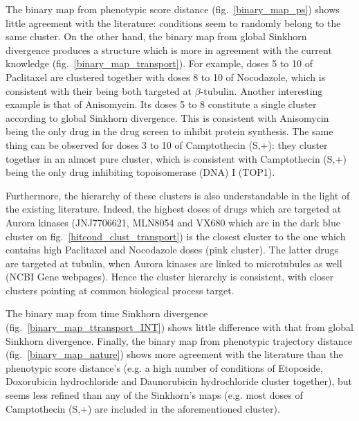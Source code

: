 The binary map from phenotypic score distance (fig.~\ref{binary_map_ps}) shows little agreement with the literature: conditions seem to randomly belong to the same cluster. On the other hand, the binary map from global Sinkhorn divergence produces a structure which is more in agreement with the current knowledge (fig.~\ref{binary_map_transport}). For example, doses 5 to 10 of Paclitaxel are clustered together with doses 8 to 10 of Nocodazole, which is consistent with their being both targeted at $\beta$-tubulin. Another interesting example is that of Anisomycin. Its doses 5 to 8 constitute a single cluster according to global Sinkhorn divergence. This is consistent with Anisomycin being the only drug in the drug screen to inhibit protein synthesis. The same thing can be observed for doses 3 to 10 of Camptothecin (S,+): they cluster together in an almost pure cluster, which is consistent with Camptothecin (S,+) being the only drug inhibiting topoisomerase (DNA) I (TOP1). 

Furthermore, the hierarchy of these clusters is also understandable in the light of the existing literature. Indeed, the highest doses of drugs which are targeted at Aurora kinases (JNJ7706621, MLN8054 and VX680 which are in the dark blue cluster on fig.~\ref{hitcond_clust_transport}) is the closest cluster to the one which contains high Paclitaxel and Nocodazole doses (pink cluster). The latter drugs are targeted at tubulin, when Aurora kinases are linked to microtubules as well (NCBI Gene webpages\cite{pmid24259432}). Hence the cluster hierarchy is consistent, with closer clusters pointing at common biological process target.

The binary map from time Sinkhorn divergence (fig.~\ref{binary_map_ttransport_INT}) shows little difference with that from global Sinkhorn divergence. Finally, the binary map from phenotypic trajectory distance (fig.~\ref{binary_map_nature}) shows more agreement with the literature than the phenotypic score distance's (e.g. a high number of conditions of Etoposide, Doxorubicin hydrochloride and Daunorubicin hydrochloride cluster together), but seems less refined than any of the Sinkhorn's maps (e.g. most doses of Camptothecin (S,+) are included in the aforementioned cluster). %

